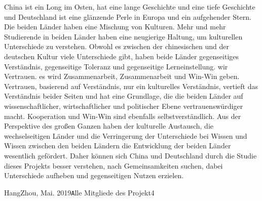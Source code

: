 \mypar
China ist ein Long im Osten, hat eine lange Geschichte und eine tiefe Geschichte und Deutschland ist eine glänzende Perle in Europa und ein aufgehender Stern. Die beiden Länder haben eine Mischung von Kulturen. Mehr und mehr Studierende in beiden Länder haben eine neugierige Haltung, um kulturellen Unterschiede zu verstehen. Obwohl es zwischen der chinesischen und der deutschen Kultur viele Unterschiede gibt, haben beide Länder gegenseitiges Verständnis, gegenseitige Toleranz und gegenseitige Lerneinstellung.  wir Vertrauen. es wird Zusammenarbeit, Zusammenarbeit und Win-Win geben. Vertrauen, basierend auf Verständnis, nur ein kulturelles Verständnis, vertieft das Verständnis beider Seiten und hat eine Grundlage, die die beiden Länder auf wissenschaftlicher, wirtschaftlicher und politischer Ebene vertrauenswürdiger macht. Kooperation und Win-Win sind ebenfalls selbstverständlich. Aus der Perspektive des großen Ganzen haben der kulturelle Austausch, die wechselseitigen Länder und die Verringerung der Unterschiede bei Wissen und Wissen zwischen den beiden Ländern die Entwicklung der beiden Länder wesentlich gefördert. Daher können sich China und Deutschland durch die Studie dieses Projekts besser verstehen, nach Gemeinsamkeiten suchen, dabei Unterschiede aufheben und gegenseitigen Nutzen erzielen.
\vspace{\baselineskip}
\begin{flushright}\noindent
HangZhou, Mai.  2019\hfill {\texttt Alle Mitgliede des Projekt4}\\
\end{flushright}
